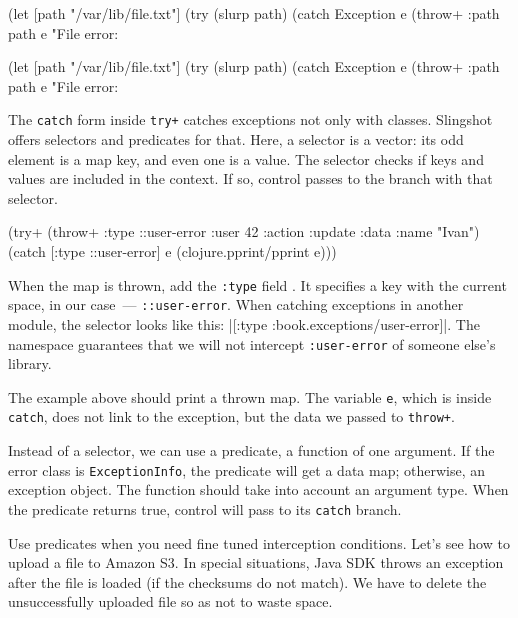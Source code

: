 \begin{clojure}
(let [path "/var/lib/file.txt"]
  (try
    (slurp path)
    (catch Exception e
      (throw+ {:path path} e
      "File error: %
\end{clojure}

\else

\begin{clojure}
(let [path "/var/lib/file.txt"]
  (try
    (slurp path)
    (catch Exception e
      (throw+ {:path path} e "File error: %
\end{clojure}

\fi


The \verb|catch| form inside \verb|try+| catches exceptions not only with classes. Slingshot offers selectors and predicates for that. Here, a selector is a vector: its odd element is a map key, and even one is a value. The selector checks if keys and values are included in the context. If so, control passes to the branch with that selector.

\begin{clojure/lines}
(try+
 (throw+ {:type ::user-error
          :user 42
          :action :update
          :data {:name "Ivan"}})
 (catch [:type ::user-error] e
   (clojure.pprint/pprint e)))
\end{clojure/lines}

When the map is thrown, add the \verb|:type| field . It specifies a key with the current space, in our case~--- \verb|::user-error|.
When catching exceptions in another module, the selector looks like this: \spverb|[:type :book.exceptions/user-error]|. The namespace guarantees that we will not intercept \texttt{:user\--error} of someone else's library.

The example above should print a thrown map. The variable \verb|e|, which is inside \verb|catch|, does not link to the exception, but the data we passed to \verb|throw+|.

Instead of a selector, we can use a predicate, a function of one argument. If the error class is \verb|ExceptionInfo|, the predicate will get a data map; otherwise, an exception object. The function should take into account an argument type. When the predicate returns true, control will pass to its \verb|catch| branch.


Use predicates when you need fine tuned interception conditions. Let's see how to upload a file to Amazon S3. In special situations, Java SDK throws an exception after the file is loaded (if the checksums do not match). We have to delete the unsuccessfully uploaded file so as not to waste space.

